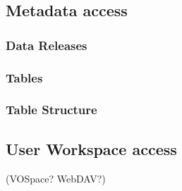 \subsection{Metadata access}\label{metadata-access}

\subsubsection{Data Releases}\label{data-releases}

\subsubsection{Tables}\label{tables}

\subsubsection{Table Structure}\label{table-structure}

\subsection{User Workspace access}\label{user-workspace-access}

(VOSpace? WebDAV?)
